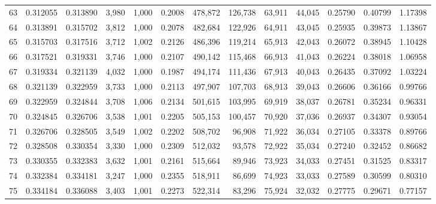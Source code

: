 \begin{tabular}{rrrrrrrrrrrrr}
63  &  0.312055 &  0.313890 &   3,980 &  1,000 &                                     0.2008 &  478,872 &  126,738 &   63,911 &   44,045 &  0.25790 &  0.40799 &  1.17398 \\
64  &  0.313891 &  0.315702 &   3,812 &  1,000 &                                     0.2078 &  482,684 &  122,926 &   64,911 &   43,045 &  0.25935 &  0.39873 &  1.13867 \\
65  &  0.315703 &  0.317516 &   3,712 &  1,002 &                                     0.2126 &  486,396 &  119,214 &   65,913 &   42,043 &  0.26072 &  0.38945 &  1.10428 \\
66  &  0.317521 &  0.319331 &   3,746 &  1,000 &                                     0.2107 &  490,142 &  115,468 &   66,913 &   41,043 &  0.26224 &  0.38018 &  1.06958 \\
67  &  0.319334 &  0.321139 &   4,032 &  1,000 &                                     0.1987 &  494,174 &  111,436 &   67,913 &   40,043 &  0.26435 &  0.37092 &  1.03224 \\
68  &  0.321139 &  0.322959 &   3,733 &  1,000 &                                     0.2113 &  497,907 &  107,703 &   68,913 &   39,043 &  0.26606 &  0.36166 &  0.99766 \\
69  &  0.322959 &  0.324844 &   3,708 &  1,006 &                                     0.2134 &  501,615 &  103,995 &   69,919 &   38,037 &  0.26781 &  0.35234 &  0.96331 \\
70  &  0.324845 &  0.326706 &   3,538 &  1,001 &                                     0.2205 &  505,153 &  100,457 &   70,920 &   37,036 &  0.26937 &  0.34307 &  0.93054 \\
71  &  0.326706 &  0.328505 &   3,549 &  1,002 &                                     0.2202 &  508,702 &   96,908 &   71,922 &   36,034 &  0.27105 &  0.33378 &  0.89766 \\
72  &  0.328508 &  0.330354 &   3,330 &  1,000 &                                     0.2309 &  512,032 &   93,578 &   72,922 &   35,034 &  0.27240 &  0.32452 &  0.86682 \\
73  &  0.330355 &  0.332383 &   3,632 &  1,001 &                                     0.2161 &  515,664 &   89,946 &   73,923 &   34,033 &  0.27451 &  0.31525 &  0.83317 \\
74  &  0.332384 &  0.334181 &   3,247 &  1,000 &                                     0.2355 &  518,911 &   86,699 &   74,923 &   33,033 &  0.27589 &  0.30599 &  0.80310 \\
75  &  0.334184 &  0.336088 &   3,403 &  1,001 &                                     0.2273 &  522,314 &   83,296 &   75,924 &   32,032 &  0.27775 &  0.29671 &  0.77157 \\

\end{tabular}
